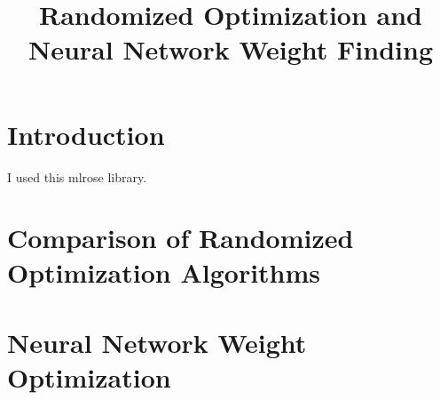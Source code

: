 \documentclass[11pt]{article}
\begin{document}
\title{Randomized Optimization and Neural Network Weight Finding}
\maketitle

\section{Introduction}
I used this mlrose library.\cite{Hayes19}
\section{Comparison of Randomized Optimization Algorithms}
\section{Neural Network Weight Optimization}

{}

\end{document}
